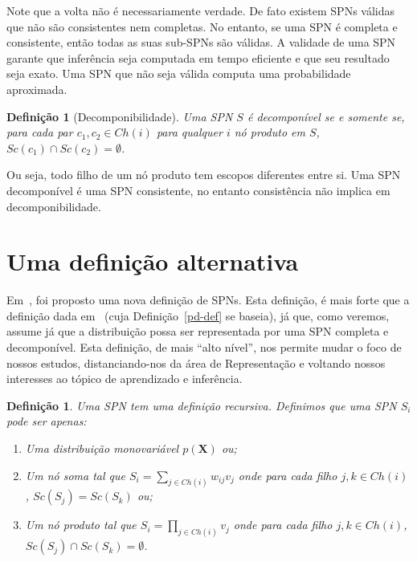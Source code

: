 \documentclass{amsart}
\theoremstyle{plain}
\newcounter{dummy-def}\numberwithin{dummy-def}{section}
\newtheorem{definition}[dummy-def]{Definição}
\newcounter{dummy-thm}\numberwithin{dummy-thm}{section}
\newcounter{dummy-prop}\numberwithin{dummy-prop}{section}
\newcounter{dummy-ex}\numberwithin{dummy-ex}{section}
\newcounter{dummy-eg}\numberwithin{dummy-eg}{section}
\numberwithin{equation}{section}
\newcommand{\set}[1]{\mathbf{#1}}
\begin{document}
Note que a volta não é necessariamente verdade. De fato existem SPNs válidas que não são
consistentes nem completas. No entanto, se uma SPN é completa e consistente, então todas as suas
sub-SPNs são válidas. A validade de uma SPN garante que inferência seja computada em tempo
eficiente e que seu resultado seja exato. Uma SPN que não seja válida computa uma probabilidade
aproximada.

\begin{definition}[Decomponibilidade]
  Uma SPN $S$ é decomponível se e somente se, para cada par $c_1, c_2 \in Ch(i)$ para qualquer $i$
  nó produto em $S$, $Sc(c_1)\cap Sc(c_2)=\emptyset$.
\end{definition}

Ou seja, todo filho de um nó produto tem escopos diferentes entre si. Uma SPN decomponível é uma
SPN consistente, no entanto consistência não implica em decomponibilidade.

\section{Uma definição alternativa}

Em~\cite{gens-domingos}, foi proposto uma nova definição de SPNs. Esta definição, é mais forte que
a definição dada em~\cite{poon-domingos} (cuja Definição~\ref{pd-def} se baseia), já que, como
veremos, assume já que a distribuição possa ser representada por uma SPN completa e decomponível.
Esta definição, de mais ``alto nível'', nos permite mudar o foco de nossos estudos,
distanciando-nos da área de Representação e voltando nossos interesses ao tópico de aprendizado e
inferência.

\begin{definition}\label{gd-def}
  Uma SPN tem uma definição recursiva. Definimos que uma SPN $S_i$ pode ser apenas:
  \begin{enumerate}[label=(\roman*)]
    \item\label{gd-ref-1} Uma distribuição monovariável $p(\set{X})$ ou;
    \item\label{gd-ref-2} Um nó soma tal que $S_i=\sum_{j\in Ch(i)} w_{ij}v_j$ onde para cada filho
      $j,k\in Ch(i)$, $Sc(S_j)=Sc(S_k)$ ou;
    \item\label{gd-ref-3} Um nó produto tal que $S_i=\prod_{j\in Ch(i)} v_j$ onde para cada filho
      $j,k\in Ch(i)$, $Sc(S_j)\cap Sc(S_k)=\emptyset$.
  \end{enumerate}
\end{definition}
\end{document}
